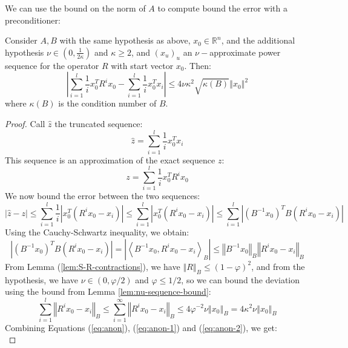 We can use the bound on the norm of $A$ to compute bound the error
with a preconditioner:
\begin{lemma}
\label{lem:partial-sequence-approximate}Consider $A,B$ with the
same hypothesis as above, $x_{0}\in\mathbb{R}^{n}$, and the additional
hypothesis $\nu\in\left(0,\frac{1}{2\kappa}\right)$ and $\kappa\ge2$,
and $\left(x_{u}\right)_{u}$ an $\nu-$approximate power sequence
for the operator $R$ with start vector $x_{0}$. Then: 
\[
\left|\sum_{i=1}^{l}\frac{1}{i}x_{0}^{T}R^{i}x_{0}-\sum_{i=1}^{l}\frac{1}{i}x_{0}^{T}x_{i}\right|\leq4\nu\kappa^{2}\sqrt{\kappa\left(B\right)}\left\Vert x_{0}\right\Vert ^{2}
\]
where $\kappa\left(B\right)$ is the condition number of $B$.\end{lemma}
\begin{proof}
Call $\hat{z}$ the truncated sequence: 
\[
\hat{z}=\sum_{i=1}^{l}\frac{1}{i}x_{0}^{T}x_{i}
\]
This sequence is an approximation of the exact sequence $z$: 
\[
z=\sum_{i=1}^{l}\frac{1}{i}x_{0}^{T}R^{i}x_{0}
\]
We now bound the error between the two sequences: 
\begin{equation}
\left|\hat{z}-z\right|\leq\sum_{i=1}^{l}\frac{1}{i}\left|x_{0}^{T}\left(R^{i}x_{0}-x_{i}\right)\right|\leq\sum_{i=1}^{l}\left|x_{0}^{T}\left(R^{i}x_{0}-x_{i}\right)\right|\leq\sum_{i=1}^{l}\left|\left(B^{-1}x_{0}\right)^{T}B\left(R^{i}x_{0}-x_{i}\right)\right|\label{eq:anon}
\end{equation}
Using the Cauchy-Schwartz inequality, we obtain: 
\begin{equation}
\left|\left(B^{-1}x_{0}\right)^{T}B\left(R^{i}x_{0}-x_{i}\right)\right|=\left|\left\langle B^{-1}x_{0},R^{i}x_{0}-x_{i}\right\rangle _{B}\right|\leq\left\Vert B^{-1}x_{0}\right\Vert _{B}\left\Vert R^{i}x_{0}-x_{i}\right\Vert _{B}\label{eq:anon-1}
\end{equation}
From Lemma (\ref{lem:S-R-contractions}), we have $\left\Vert R\right\Vert _{B}\leq\left(1-\varphi\right)^{2}$,
and from the hypothesis, we have $\nu\in\left(0,\varphi/2\right)$
and $\varphi\le1/2$, so we can bound the deviation using the bound
from Lemma \ref{lem:nu-sequence-bound}: 
\begin{equation}
\sum_{i=1}^{l}\left\Vert R^{i}x_{0}-x_{i}\right\Vert _{B}\leq\sum_{i=1}^{\infty}\left\Vert R^{i}x_{0}-x_{i}\right\Vert _{B}\leq4\varphi^{-2}\nu\left\Vert x_{0}\right\Vert _{B}=4\kappa^{2}\nu\left\Vert x_{0}\right\Vert _{B}\label{eq:anon-2}
\end{equation}
Combining Equations (\ref{eq:anon}), (\ref{eq:anon-1}) and (\ref{eq:anon-2}),
we get: 
\[
\]
\end{proof}
